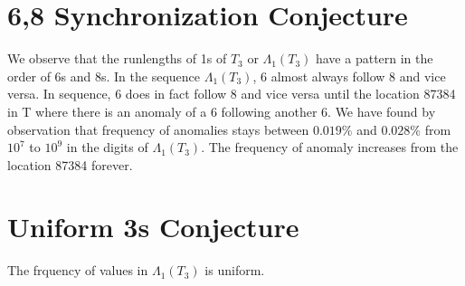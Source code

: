 \documentclass{article}
\begin{document}
\section{6,8 Synchronization Conjecture}
We observe that the runlengths of 1s of $T_3$ or $\Lambda{_1(T_3)}$ have a pattern in the order of 6s and 8s. In the sequence $\Lambda{_1(T_3)}$, 6 almost always follow 8 and vice versa. In sequence, 6 does in fact follow 8 and vice versa until the location 87384 in T where there is an anomaly of a 6 following another 6. We have found by observation that frequency of anomalies stays between $0.019\%$ and $0.028\%$ from $10^7$ to $10^9$ in the digits of $\Lambda{_1(T_3)}$. The frequency of anomaly increases from the location 87384 forever.

\section{Uniform 3s Conjecture}
The frquency of values in $\Lambda{_1(T_3)}$ is uniform.
\end{document}
